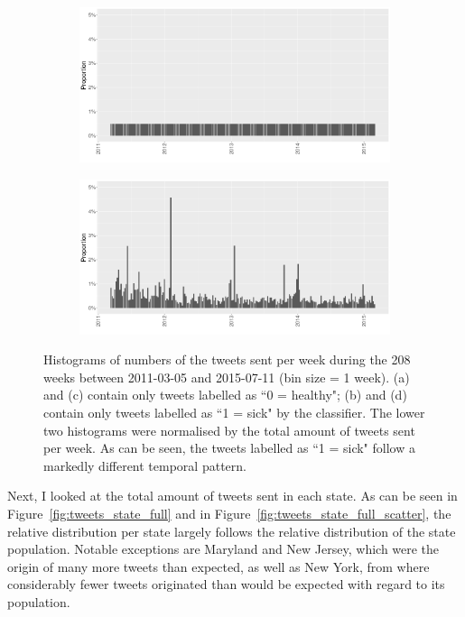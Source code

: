 \documentclass[11pt, a4paper]{report}\usepackage[]{graphicx}\usepackage[]{color}
\begin{document}
\begin{figure}[H]
    \begin{subfigure}[t]{0.49\textwidth}
  \includegraphics[width=1\linewidth]{activity_rel_healthy_date_Twitter_full_aggregated.png}
  \caption{}
  \end{subfigure}
  \hfill
    \begin{subfigure}[t]{0.49\textwidth}
  \includegraphics[width=1\linewidth]{activity_rel_sick_date_Twitter_full_aggregated.png}
  \caption{}
  \end{subfigure}
  \caption{Histograms of numbers of the tweets sent per week during the 208 weeks between 2011-03-05 and 2015-07-11 (bin size = 1 week). (a) and (c) contain only tweets labelled as ``0 = healthy"; (b) and (d) contain only tweets labelled as ``1 = sick" by the classifier. The lower two histograms were normalised by the total amount of tweets sent per week. As can be seen, the tweets labelled as ``1 = sick" follow a markedly different temporal pattern.}
  \label{fig:tweets_seasonal_healthy_sick}
\end{figure}

Next, I looked at the total amount of tweets sent in each state. As can be seen in Figure~\ref{fig:tweets_state_full} and in Figure~\ref{fig:tweets_state_full_scatter}, the relative distribution per state largely follows the relative distribution of the state population. Notable exceptions are Maryland and New Jersey, which were the origin of many more tweets than expected, as well as New York, from where considerably fewer tweets originated than would be expected with regard to its population.\newline
\end{document}
